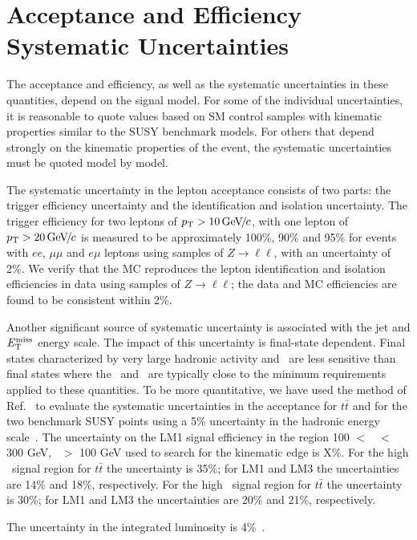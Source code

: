 \section{Acceptance and Efficiency Systematic Uncertainties}
\label{sec:systematics}

The acceptance and efficiency, as well as the systematic uncertainties in these quantities, 
depend on the signal model.
For some of the individual uncertainties, it is reasonable to quote values 
based on SM control samples with kinematic properties similar to the SUSY benchmark models. 
For others that depend strongly on the kinematic properties of the event, the systematic
uncertainties must be quoted model by model.

The systematic uncertainty in the lepton acceptance consists
of two parts: the trigger efficiency uncertainty and the 
identification and isolation uncertainty. The trigger efficiency 
for two leptons of $p_{\mathrm{T}}>10{\,\text{Ge\hspace{-.08em}V\hspace{-0.16em}/\hspace{-0.08em}}c}$, with one lepton of 
$p_{\mathrm{T}}>20{\,\text{Ge\hspace{-.08em}V\hspace{-0.16em}/\hspace{-0.08em}}c}$ is measured to be approximately 100\%, 90\% and 95\%
for events with $ee$, $\mu\mu$ and $e\mu$ leptons using samples of $Z \to \ell\ell$, 
with an uncertainty of 2\%. We verify that the MC reproduces the lepton identification and isolation efficiencies in data using
samples of $Z \to \ell\ell$; the data and MC efficiencies are found to be consistent within 2\%.

Another significant source of systematic uncertainty is 
associated with the jet and $E_{\mathrm{T}}^{\text{miss}}$ energy scale.  The impact
of this uncertainty is final-state dependent.  Final
states characterized by very large hadronic activity and \MET\ are 
less sensitive than final states where the \MET\ and \HT\ 
are typically close to the minimum requirements applied to these quantities.  To be more quantitative,
we have used the method of Ref.~\cite{ref:top} to evaluate
the systematic uncertainties in the acceptance for $t\bar{t}$ 
and for the two benchmark SUSY points using a 5\% uncertainty in the hadronic 
energy scale~\cite{ref:jes}.
The uncertainty on the LM1 signal efficiency in the region 100 $<$ \Ht\ $<$ 300 GeV,
\MET\ $>$ 100 GeV used to search for the kinematic edge is X\%.
For the high \MET\ signal region for $t\bar{t}$ the uncertainty is 35\%; for LM1 and LM3 the 
uncertainties are 14\% and 18\%, respectively.
For the high \Ht\ signal region for $t\bar{t}$ the uncertainty is 30\%; for LM1 and LM3 the 
uncertainties are 20\% and 21\%, respectively.

The uncertainty in the integrated luminosity is 4\%~\cite{ref:lumi}.
